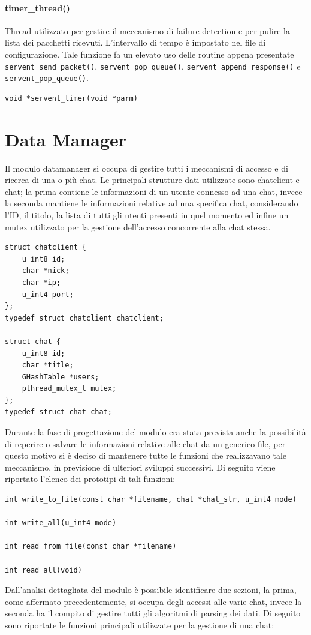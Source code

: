 \paragraph{timer\_thread()}
Thread utilizzato per gestire il meccanismo di failure detection e per pulire la lista dei pacchetti ricevuti. L'intervallo di tempo è impostato nel file di configurazione. Tale funzione fa un elevato uso delle routine appena presentate \texttt{servent\_send\_packet()}, \texttt{servent\_pop\_queue()}, \texttt{servent\_append\_response()} e \texttt{servent\_pop\_queue()}.
\begin{lstlisting}[frame=trBL]
void *servent_timer(void *parm)
\end{lstlisting}

\section{Data Manager}
Il modulo datamanager si occupa di gestire tutti i meccanismi di accesso e di ricerca di una o più chat. Le principali strutture dati utilizzate sono chatclient e chat; la prima contiene le informazioni di un utente connesso ad una chat, invece la seconda mantiene le informazioni relative ad una specifica chat, considerando l'ID, il titolo, la lista di tutti gli utenti presenti in quel momento ed infine un mutex utilizzato per la gestione dell'accesso concorrente alla chat stessa. 
\begin{lstlisting}
struct chatclient {
	u_int8 id;
	char *nick;
	char *ip;
	u_int4 port;
};
typedef struct chatclient chatclient;

struct chat {
	u_int8 id;
	char *title;
	GHashTable *users;
	pthread_mutex_t mutex;
};
typedef struct chat chat;
\end{lstlisting}
Durante la fase di progettazione del modulo era stata prevista anche la possibilità di reperire o salvare le informazioni relative alle chat da un generico file, per questo motivo si è deciso di mantenere tutte le funzioni che realizzavano tale meccanismo, in previsione  di ulteriori sviluppi successivi. Di seguito viene riportato l'elenco dei prototipi di tali funzioni:
\begin{lstlisting}
int write_to_file(const char *filename, chat *chat_str, u_int4 mode)

int write_all(u_int4 mode)

int read_from_file(const char *filename)

int read_all(void)
\end{lstlisting}  
Dall'analisi dettagliata del modulo è possibile identificare due sezioni, la prima, come affermato precedentemente, si occupa degli accessi alle varie chat, invece la seconda ha il compito di gestire tutti gli algoritmi di parsing dei dati. Di seguito sono riportate le funzioni principali utilizzate per la gestione di una chat:
